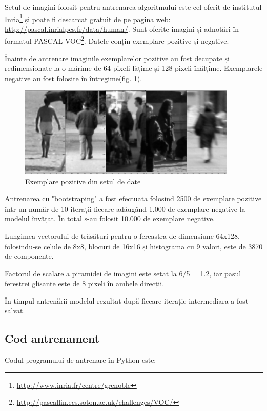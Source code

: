 Setul de imagini folosit pentru antrenarea algoritmului este cel oferit de institutul Inria\footnote{\url{http://www.inria.fr/centre/grenoble}} și poate fi descarcat gratuit de pe pagina web: \url{http://pascal.inrialpes.fr/data/human/}. 
Sunt oferite imagini și adnotări în formatul PASCAL VOC\footnote{\url{http://pascallin.ecs.soton.ac.uk/challenges/VOC/}}.
Datele conțin exemplare pozitive și negative.
%

Înainte de antrenare imaginile exemplarelor pozitive au fost decupate și redimensionate la o mărime de 64 pixeli lățime și 128 pixeli înălțime.
Exemplarele negative au fost folosite în întregime(fig. \ref{fig:exemplare_pozitive_inria_person}).

\begin{figure}[H]
	\centering
		\includegraphics[width=0.93\textwidth]{imagini/exemplare_pozitive_inria_person.png}
	\caption{Exemplare pozitive din setul de date}
	\label{fig:exemplare_pozitive_inria_person}
\end{figure}


Antrenarea cu "bootstraping" a fost efectuata folosind 2500 de exemplare pozitive într-un număr de 10 iterații fiecare adăugând 1.000 de exemplare negative la modelul învățat. În total s-au folosit 10.000 de exemplare negative.

Lungimea vectorului de trăsături pentru o fereastra de dimensiune 64x128, folosindu-se celule de 8x8, blocuri de 16x16 și histograma cu 9 valori, este de 3870 de componente.

Factorul de scalare a piramidei de imagini este setat la 6/5 = 1.2, iar pasul ferestrei glisante este de 8 pixeli în ambele direcții.

În timpul antrenării modelul rezultat după fiecare iterație intermediara a fost salvat.

\subsection{Cod antrenament}
Codul programului de antrenare în Python este:


